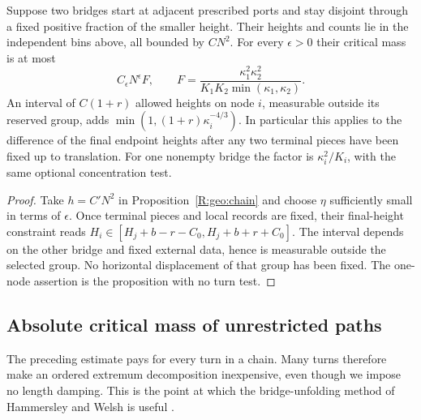 \begin{corollary}
\label{R:geo:two-ends}
Suppose two bridges start at adjacent prescribed ports and stay disjoint
through a fixed positive fraction of the smaller height.  Their heights
and counts lie in the independent bins above, all bounded by $CN^2$.
For every $\epsilon>0$ their critical mass is at most
\begin{equation}\label{R:geo:two-end-mass}
 C_\epsilon N^\epsilon F,\qquad
 F=\frac{\kappa_1^2\kappa_2^2}
              {K_1K_2\min(\kappa_1,\kappa_2)}.
\end{equation}
An interval of $C(1+r)$ allowed heights on node $i$, measurable outside
its reserved group, adds $\min(1,(1+r)\kappa_i^{-4/3})$.
In particular this applies to the difference of the final endpoint
heights after any two terminal pieces have been fixed up to translation.
For one nonempty bridge the factor is $\kappa_i^2/K_i$, with the same
optional concentration test.
\end{corollary}
\begin{proof}
Take $h=C'N^2$ in Proposition~\ref{R:geo:chain} and choose $\eta$
sufficiently small in terms of $\epsilon$.  Once terminal pieces and
local records are fixed, their final-height constraint reads
$H_i\in[H_j+b-r-C_0,H_j+b+r+C_0]$.  The interval depends on the other
bridge and fixed external data, hence is measurable outside the selected
group.  No horizontal displacement of that group has been fixed.
The one-node assertion is the proposition with no turn test.
\end{proof}

\subsection{Absolute critical mass of unrestricted paths}

The preceding estimate pays for every turn in a chain.  Many turns
therefore make an ordered extremum decomposition inexpensive, even though
we impose no length damping.  This is the point at which the
bridge-unfolding method of Hammersley and Welsh is useful
\cite{HammersleyWelsh1962,MadrasSlade1993}.

